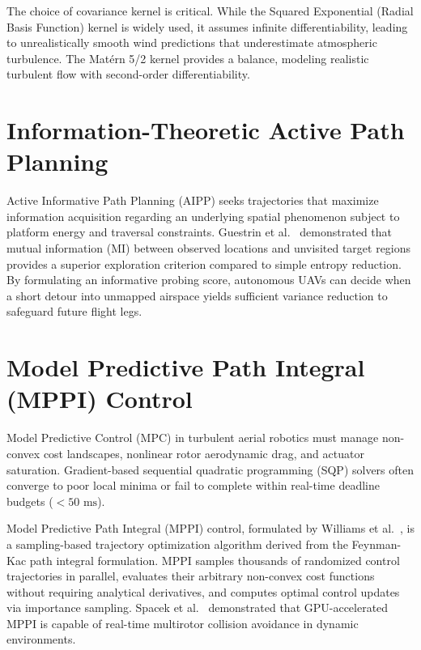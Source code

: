 \documentclass[12pt,a4paper,oneside]{report}
\begin{document}
The choice of covariance kernel is critical. While the Squared Exponential (Radial Basis Function) kernel is widely used, it assumes infinite differentiability, leading to unrealistically smooth wind predictions that underestimate atmospheric turbulence. The Mat\'ern 5/2 kernel provides a balance, modeling realistic turbulent flow with second-order differentiability.

\section{Information-Theoretic Active Path Planning}
Active Informative Path Planning (AIPP) seeks trajectories that maximize information acquisition regarding an underlying spatial phenomenon subject to platform energy and traversal constraints. Guestrin et al.~\cite{guestrin2005} demonstrated that mutual information (MI) between observed locations and unvisited target regions provides a superior exploration criterion compared to simple entropy reduction. By formulating an informative probing score, autonomous UAVs can decide when a short detour into unmapped airspace yields sufficient variance reduction to safeguard future flight legs.

\section{Model Predictive Path Integral (MPPI) Control}
Model Predictive Control (MPC) in turbulent aerial robotics must manage non-convex cost landscapes, nonlinear rotor aerodynamic drag, and actuator saturation. Gradient-based sequential quadratic programming (SQP) solvers often converge to poor local minima or fail to complete within real-time deadline budgets ($<50\text{ ms}$).

Model Predictive Path Integral (MPPI) control, formulated by Williams et al.~\cite{williams2018}, is a sampling-based trajectory optimization algorithm derived from the Feynman-Kac path integral formulation. MPPI samples thousands of randomized control trajectories in parallel, evaluates their arbitrary non-convex cost functions without requiring analytical derivatives, and computes optimal control updates via importance sampling. Spacek et al.~\cite{spacek2022} demonstrated that GPU-accelerated MPPI is capable of real-time multirotor collision avoidance in dynamic environments.

\end{document}
